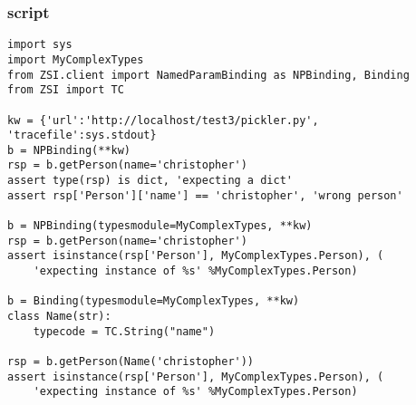 \subsubsection{script}
\begin{verbatim}
import sys
import MyComplexTypes
from ZSI.client import NamedParamBinding as NPBinding, Binding
from ZSI import TC

kw = {'url':'http://localhost/test3/pickler.py', 'tracefile':sys.stdout}
b = NPBinding(**kw)
rsp = b.getPerson(name='christopher')
assert type(rsp) is dict, 'expecting a dict'
assert rsp['Person']['name'] == 'christopher', 'wrong person'

b = NPBinding(typesmodule=MyComplexTypes, **kw)
rsp = b.getPerson(name='christopher')
assert isinstance(rsp['Person'], MyComplexTypes.Person), (
    'expecting instance of %s' %MyComplexTypes.Person)

b = Binding(typesmodule=MyComplexTypes, **kw)
class Name(str):
    typecode = TC.String("name")

rsp = b.getPerson(Name('christopher'))
assert isinstance(rsp['Person'], MyComplexTypes.Person), (
    'expecting instance of %s' %MyComplexTypes.Person)
\end{verbatim}

